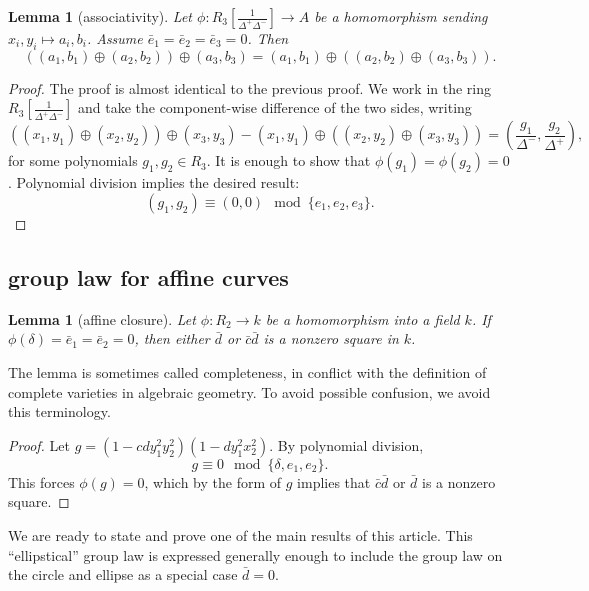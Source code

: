 \documentclass[12pt]{article}
\newtheorem{lemma}[theorem]{Lemma}
\newcommand{\f}[1]{\frac{1}{#1}}
\def\cong{\equiv}
\begin{document}
\begin{lemma}[associativity] \label{lemma:assoc} Let
  $\phi:R_3[\f{\Delta^+\Delta^-}]\to A$ be a homomorphism sending
  $x_i,y_i\mapsto a_i,b_i$.  Assume $\bar e_1 = \bar e_ 2= \bar e_3 =
  0$. Then
\[
((a_1,b_1)\oplus (a_2,b_2)) \oplus (a_3,b_3)=
(a_1,b_1)\oplus ((a_2,b_2) \oplus (a_3,b_3)).
\]
\end{lemma}

\begin{proof} The proof is almost identical to the previous proof.  We
  work in the ring $R_3[\f{\Delta^+\Delta^-}]$ and take the
  component-wise difference of the two sides, writing
\[
((x_1,y_1)\oplus (x_2,y_2)) \oplus (x_3,y_3)-
(x_1,y_1)\oplus ((x_2,y_2) \oplus (x_3,y_3)) 
= (\frac{g_1}{\Delta^-},\frac{g_2}{\Delta^+}),
\]
for some polynomials $g_1,g_2 \in R_3$.  
It is enough to show that $\phi(g_1)=\phi(g_2)=0$. 
Polynomial division implies the desired result:
\[
(g_1,g_2)\cong (0,0) \mod \{e_1,e_2,e_3\}.
\]
\end{proof}

\subsection{group law for affine curves}

\begin{lemma}[affine closure] \label{lemma:affine} Let $\phi:R_2\to k$
  be a homomorphism into a field $k$.  If $\phi(\delta)=\bar e_1=\bar
  e_2=0$, then either $\bar d$ or $\bar c \bar d$ is a nonzero square
  in $k$.
\end{lemma}

The lemma is sometimes called completeness, in conflict with the
definition of complete varieties in algebraic geometry.  To avoid
possible confusion, we avoid this terminology.

\begin{proof} 
  Let $g = (1 - c d y_1^2 y_2 ^2) (1 - d y_1^2 x_2^2)$.  By polynomial
  division,
\begin{equation}\label{eqn:squares}
  g \cong 0 \mod \{\delta,e_1,e_2\}.
\end{equation}
This forces $\phi(g)=0$, which by the form of $g$ implies that $\bar
c\bar d$ or $\bar d$ is a nonzero square.
\end{proof}

We are ready to state and prove one of the main results of this
article.  This ``ellipstical'' group law is expressed generally enough
to include the group law on the circle and ellipse as a special case 
$\bar d = 0$.
\end{document}
